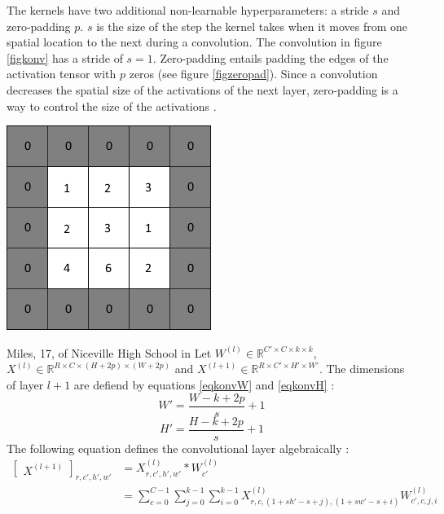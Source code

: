 \documentclass[paperwidth=48in,paperheight=48in, fontscale=0.4166666666666, landscape]{baposter}
\begin{document}
\begin{poster}
{The kernels have two additional non-learnable hyperparameters: a stride $s$ and zero-padding $p$. $s$ is the size of the step the kernel takes when it moves from one spatial location to the next during a convolution. The convolution in figure \ref{figkonv} has a stride of $s = 1$. Zero-padding entails padding the edges of the activation tensor with $p$ zeros (see figure \ref{figzeropad}). Since a convolution decreases the spatial size of the activations of the next layer, zero-padding is a way to control the size of the activations \cite{cs231n} \cite{convmath} \cite{convarithmetic}. 

\begin{center}
   \includegraphics[scale=0.7]{zeropadding.png}
   \label{figzeropad}
\end{center}
Miles, 17, of Niceville High School in 
Let $W^{(l)} \in \mathbb{R}^{C' \times C  \times k \times k}$, $X^{(l)} \in \mathbb{R}^{R \times C  \times (H+2p) \times (W+2p)}$ and $X^{(l+1)} \in \mathbb{R}^{R \times C'  \times H' \times W'}$. The dimensions of layer $l+1$ are defiend by equations \eqref{eqkonvW} and \eqref{eqkonvH} \cite{cs231n} \cite{convmath} \cite{convarithmetic}: 
\begin{equation}\label{eqkonvW}
W' = \frac{W-k+2p}{s} +1
\end{equation}
\begin{equation}\label{eqkonvH}
H' = \frac{H-k+2p}{s} +1
\end{equation}
The following equation defines the convolutional layer algebraically \cite{cs231n} \cite{convmath}:
\begin{equation}\label{konvolution}
\begin{split}
	\begin{bmatrix} X^{(l+1)} \end{bmatrix}_{r, c', h', w'}	
		& = X^{(l)}_{r, c', h', w'} *W^{(l)}_{c'} \\
		& = \sum^{C-1 }_{c=0} \sum^{k-1 }_{j=0} \sum^{k-1 }_{i=0} X^{(l)}_{r, c, (1+sh'-s+j), (1+sw'-s+i)}W^{(l)}_{c', c, j, i}
\end{split}
\end{equation}

}
\end{poster}
\end{document}
